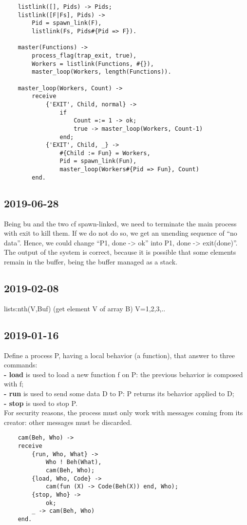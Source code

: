 \begin{lstlisting}
    listlink([], Pids) -> Pids;
    listlink([F|Fs], Pids) ->
        Pid = spawn_link(F),
        listlink(Fs, Pids#{Pid => F}).

    master(Functions) ->
        process_flag(trap_exit, true),
        Workers = listlink(Functions, #{}),
        master_loop(Workers, length(Functions)).

    master_loop(Workers, Count) ->
        receive
            {'EXIT', Child, normal} ->
                if
                    Count =:= 1 -> ok;
                    true -> master_loop(Workers, Count-1)
                end;
            {'EXIT', Child, _} ->
                #{Child := Fun} = Workers,
                Pid = spawn_link(Fun),
                master_loop(Workers#{Pid => Fun}, Count)
        end.
\end{lstlisting}

\subsection{2019-06-28}
Being bu and the two cf spawn-linked, we need to terminate the main process with exit to kill them. If we do not do
so, we get an unending sequence of “no data”. Hence, we could change “{P1, done} -> ok” into {P1, done} -> exit(done)”.
The output of the system is correct, because it is possible that some elements remain in the buffer, being the buffer managed as a
stack.

\subsection{2019-02-08}
lists:nth(V,Buf) (get element V of array B) V=1,2,3,..

\subsection{2019-01-16}
Define a process P, having a local behavior (a function), that answer to three commands: \\
\textbf{- load} is used to load a new function f on P: the previous behavior is composed with f; \\
\textbf{- run} is used to send some data D to P: P returns its behavior applied to D; \\
\textbf{- stop} is used to stop P. \\
For security reasons, the process must only work with messages coming from its creator: other messages must be discarded.
\begin{lstlisting}
    cam(Beh, Who) ->
    receive
        {run, Who, What} ->
            Who ! Beh(What),
            cam(Beh, Who);
        {load, Who, Code} ->
            cam(fun (X) -> Code(Beh(X)) end, Who);
        {stop, Who} ->
            ok;
        _ -> cam(Beh, Who)
    end.
\end{lstlisting}
